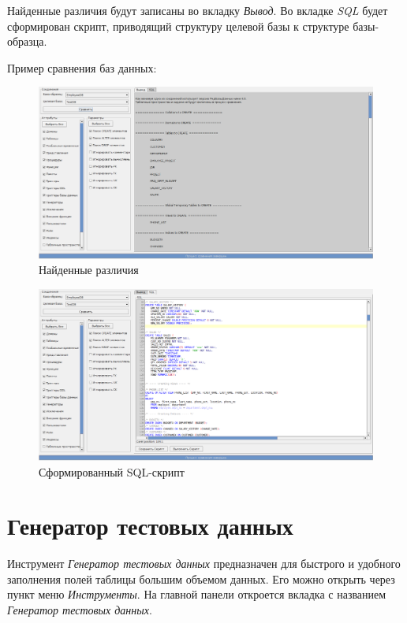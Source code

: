 Найденные различия будут записаны во вкладку \textit{Вывод}. Во вкладке \textit{SQL} будет сформирован скрипт, приводящий структуру целевой базы к структуре базы-образца.

Пример сравнения баз данных:
\begin{figure}[H]
	\centering
	\includegraphics[width = 1\linewidth]{img/compareDB_module_example.png}
	\caption{Найденные различия}
\end{figure}

\begin{figure}[H]
	\centering
	\includegraphics[width = 1\linewidth]{img/compareDB_module_exampleSQL.png}
	\caption{Сформированный SQL-скрипт}
\end{figure}

\newpage

\section{Генератор тестовых данных}\label{sec:test_data_generator}

Инструмент \textit{Генератор тестовых данных} предназначен для быстрого и удобного заполнения полей таблицы большим объемом данных. Его можно открыть через пункт меню \textit{Инструменты}.
На главной панели откроется вкладка с названием \textit{Генератор тестовых данных}. 

